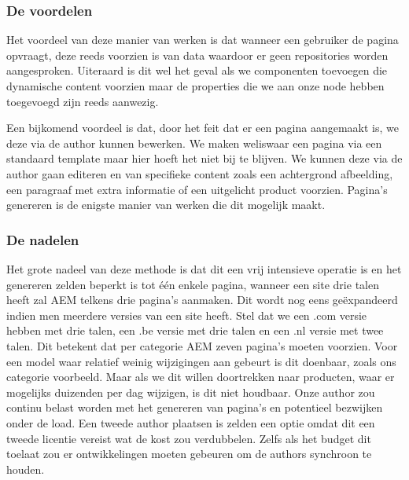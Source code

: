 \documentclass{article}
\begin{document}
	\subsubsection{De voordelen}
    Het voordeel van deze manier van werken is dat wanneer een gebruiker de pagina opvraagt, deze reeds voorzien is van data waardoor er geen repositories worden aangesproken. Uiteraard is dit wel het geval als we componenten toevoegen die dynamische content voorzien maar de properties die we aan onze node hebben toegevoegd zijn reeds aanwezig.
    \par
     Een bijkomend voordeel is dat, door het feit dat er een pagina aangemaakt is, we deze via de author kunnen bewerken. We maken weliswaar een pagina via een standaard template maar hier hoeft het niet bij te blijven. We kunnen deze via de author gaan editeren en van specifieke content zoals een achtergrond afbeelding, een paragraaf met extra informatie of een uitgelicht product voorzien. Pagina's genereren is de enigste manier van werken die dit mogelijk maakt.
	\subsubsection{De nadelen}
    Het grote nadeel van deze methode is dat dit een vrij intensieve operatie is en het genereren zelden beperkt is tot \'e\'en enkele pagina, wanneer een site drie talen heeft zal AEM telkens drie pagina's aanmaken. Dit wordt nog eens ge\"expandeerd indien men meerdere versies van een site heeft. Stel dat we een .com versie hebben met drie talen, een .be versie met drie talen en een .nl versie met twee talen. Dit betekent dat per categorie AEM zeven pagina's moeten voorzien. Voor een model waar relatief weinig wijzigingen aan gebeurt is dit doenbaar, zoals ons categorie voorbeeld. Maar als we dit willen doortrekken naar producten, waar er mogelijks duizenden per dag wijzigen, is dit niet houdbaar. Onze author zou continu belast worden met het genereren van pagina's en potentieel bezwijken onder de load. Een tweede author plaatsen is zelden een optie omdat dit een tweede licentie vereist wat de kost zou verdubbelen. Zelfs als het budget dit toelaat zou er ontwikkelingen moeten gebeuren om de authors synchroon te houden. 
\end{document}
